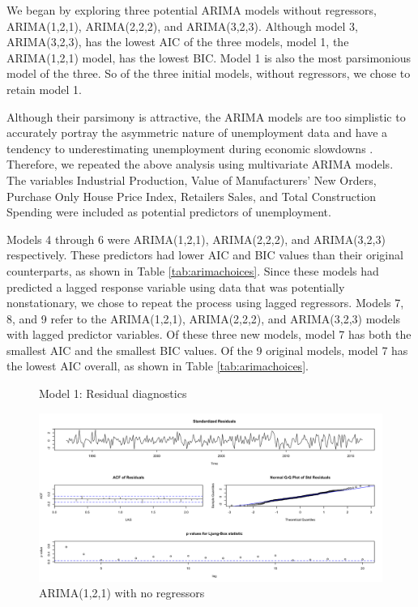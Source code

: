 \documentclass[twoside,twocolumn]{article}
\begin{document}
We began by exploring three potential ARIMA models without regressors, ARIMA(1,2,1), ARIMA(2,2,2), and ARIMA(3,2,3). Although model 3, ARIMA(3,2,3), has the lowest AIC of the three models, model 1, the ARIMA(1,2,1) model, has the lowest BIC. Model 1 is also the most parsimonious model of the three. So of the three initial models, without regressors, we chose to retain model 1.

Although their parsimony is attractive, the ARIMA models are too simplistic to accurately portray the asymmetric nature of unemployment data and have a tendency to underestimating unemployment during economic slowdowns \citep{Montgomery1998}. Therefore, we repeated the above analysis using multivariate ARIMA models.  The variables Industrial Production, Value of Manufacturers' New Orders, Purchase Only House Price Index,  Retailers Sales, and Total Construction Spending were included as potential predictors of unemployment.

Models 4 through 6 were ARIMA(1,2,1), ARIMA(2,2,2), and ARIMA(3,2,3) respectively.  These predictors had lower AIC and BIC values than their original counterparts, as shown in Table \ref{tab:arimachoices}. Since these models had predicted a lagged response variable using data that was potentially nonstationary, we chose to repeat the process using lagged regressors.  Models 7, 8, and 9 refer to the ARIMA(1,2,1), ARIMA(2,2,2), and ARIMA(3,2,3) models with lagged predictor variables.  Of these three new models, model 7 has both the smallest AIC and the smallest BIC values. Of the 9 original models, model 7 has the lowest AIC overall, as shown in Table \ref{tab:arimachoices}.


		    \begin{figure}[htb]
    	\centering
    	\caption{Model 1: Residual diagnostics}
     	\includegraphics[width=\linewidth]{images/sarima1}
     	\caption*{ARIMA(1,2,1) with no regressors}
     	\label{fig:sarimamod1}
     \end{figure}
\end{document}
